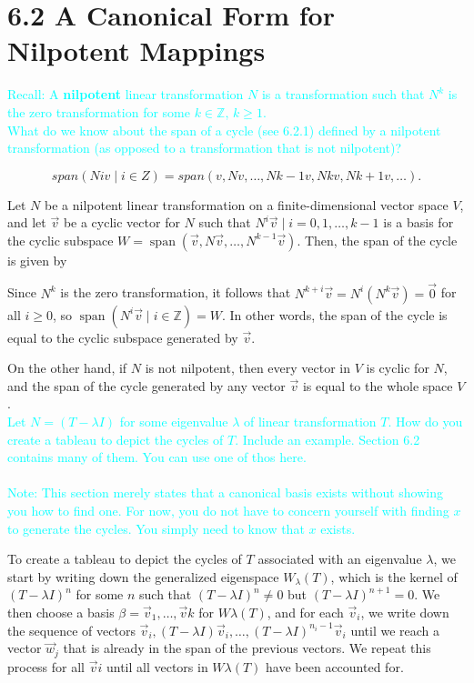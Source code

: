 \documentclass[fontsize=12pt]{scrartcl}
\begin{document}
\section{6.2 A Canonical Form for Nilpotent Mappings}

\bigskip

\noindent
\textcolor{cyan}{Recall: A \textbf{nilpotent} linear transformation $N$ is a transformation such that $N^k$ is the zero transformation for some $k \in \mathbb{Z}$, $k \geq 1$.}\\

\noindent
\textcolor{cyan}{What do we know about the span of a cycle (see 6.2.1) defined by a nilpotent transformation (as opposed to a transformation that is not nilpotent)?}

$$span(N iv∣i∈Z)=span( v,N v,…,N k−1  v ,N k  v ,N k+1  v ,…). $$

\noindent
Let $N$ be a nilpotent linear transformation on a finite-dimensional vector space $V$, and let $\vec{v}$ be a cyclic vector for $N$ such that ${N^i \vec{v} \mid i = 0,1,\ldots, k-1}$ is a basis for the cyclic subspace $W = \operatorname{span}(\vec{v}, N\vec{v}, \ldots, N^{k-1}\vec{v})$. Then, the span of the cycle is given by

\noindent
Since $N^k$ is the zero transformation, it follows that $N^{k+i} \vec{v} = N^i(N^k \vec{v}) = \vec{0}$ for all $i \geq 0$, so $\operatorname{span}(N^i \vec{v} \mid i \in \mathbb{Z}) = W$. In other words, the span of the cycle is equal to the cyclic subspace generated by $\vec{v}$.

\noindent
On the other hand, if $N$ is not nilpotent, then every vector in $V$ is cyclic for $N$, and the span of the cycle generated by any vector $\vec{v}$ is equal to the whole space $V$.
\\



\noindent
\textcolor{cyan}{Let $N = (T-\lambda I)$ for some eigenvalue $\lambda$ of linear transformation $T$. How do you create a tableau to depict the cycles of $T$. Include an example. Section 6.2 contains many of them. You can use one of thos here.}\\
\\
\textcolor{cyan}{Note: This section merely states that a canonical basis exists without showing you how to find one. For now, you do not have to concern yourself with finding $x$ to generate the cycles. You simply need to know that $x$ exists.}

\noindent
To create a tableau to depict the cycles of $T$ associated with an eigenvalue $\lambda$, we start by writing down the generalized eigenspace $W_{\lambda}(T)$, which is the kernel of $(T-\lambda I)^n$ for some $n$ such that $(T-\lambda I)^n \neq 0$ but $(T-\lambda I)^{n+1} = 0$. We then choose a basis $\beta = {\vec{v}_1, \ldots, \vec{v}k}$ for $W{\lambda}(T)$, and for each $\vec{v}_i$, we write down the sequence of vectors ${\vec{v}_i, (T-\lambda I)\vec{v}_i, \ldots, (T-\lambda I)^{n_i-1}\vec{v}_i}$ until we reach a vector $\vec{w}_j$ that is already in the span of the previous vectors. We repeat this process for all $\vec{v}i$ until all vectors in $W{\lambda}(T)$ have been accounted for.
\end{document}
